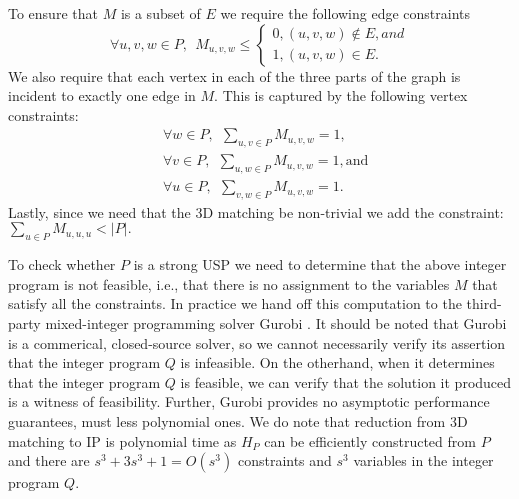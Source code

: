 \documentclass[11pt]{article}
\begin{document}
To ensure that $M$ is a subset of $E$ we require the following edge constraints
\begin{equation}
  \forall u,v,w \in P,~~M_{u,v,w} \le \begin{cases} 0, (u,v,w) \not\in
    E, and \\ 1, (u,v,w) \in E.\end{cases} \label{eqn:cons1}
\end{equation} We also require that each vertex in
each of the three parts of the graph is incident to exactly one edge
in $M$.  This is captured by the following vertex constraints:
\begin{equation}
  \label{eqn:cons2}
\begin{aligned}
&\forall w \in P,~~\sum_{u,v \in P} M_{u,v,w} = 1,\\
&\forall v \in P,~~\sum_{u,w \in P} M_{u,v,w} = 1,\text{and} \\
&\forall u \in P,~~\sum_{v,w \in P} M_{u,v,w} = 1.
\end{aligned}
\end{equation}
Lastly, since we need that the 3D matching be non-trivial we
add the constraint:
  $\sum_{u \in P} M_{u,u,u} < |P|.$




To check whether $P$ is a strong USP we need to determine that the
above integer program is not feasible,
i.e., that there is no
assignment to the variables $M$ that satisfy all the constraints.  In
practice we hand off this computation to the third-party mixed-integer
programming solver Gurobi \cite{gurobi}.  It should be noted that
Gurobi is a commerical, closed-source solver, so we cannot necessarily
verify its assertion that the integer program $Q$ is infeasible.  On
the otherhand, when it determines that the integer program $Q$ is
feasible, we can verify that the solution it produced is a witness of
feasibility.  Further, Gurobi provides no asymptotic performance
guarantees, must less polynomial ones.  We do note that reduction from
3D matching to IP is polynomial time as $H_P$ can be efficiently
constructed from $P$ and there are $s^3 + 3s^3 + 1 = O(s^3)$
constraints and $s^3$ variables in the integer program $Q$.
 
\end{document}
